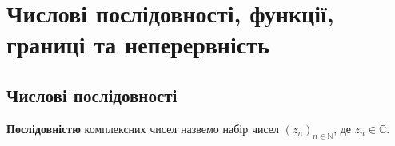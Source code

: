 \documentclass{math_library}
\begin{document}

\newpage

\section{Числові послідовності, функції, границі та неперервність}
\subsection{Числові послідовності}
\begin{definition}
\textbf{Послідовністю} комплексних чисел назвемо набір чисел $(z_n)_{n \in \mathbb{N}}$, де $z_n \in \mathbb{C}$.
\end{definition}
\end{document}
